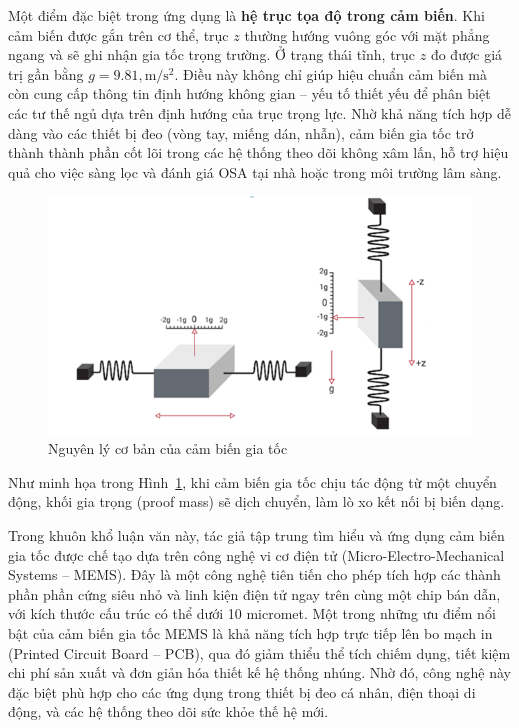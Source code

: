Một điểm đặc biệt trong ứng dụng là \textbf{hệ trục tọa độ trong cảm biến}. Khi
cảm biến được gắn trên cơ thể, trục $z$ thường hướng vuông góc với mặt phẳng
ngang và sẽ ghi nhận gia tốc trọng trường. Ở trạng thái tĩnh, trục $z$ đo được
giá trị gần bằng $g = 9.81, \mathrm{m/s^2}$. Điều này không chỉ giúp hiệu chuẩn
cảm biến mà còn cung cấp thông tin định hướng không gian – yếu tố thiết yếu để
phân biệt các tư thế ngủ dựa trên định hướng của trục trọng lực. Nhờ khả năng
tích hợp dễ dàng vào các thiết bị đeo (vòng tay, miếng dán, nhẫn), cảm biến gia
tốc trở thành thành phần cốt lõi trong các hệ thống theo dõi không xâm lấn, hỗ
trợ hiệu quả cho việc sàng lọc và đánh giá OSA tại nhà hoặc trong môi trường
lâm sàng.
\begin{figure}[!ht]
  \centering
  \includegraphics[width=\textwidth]{images/acce.png}
  \vspace*{-7mm}
  \caption{Nguyên lý cơ bản của cảm biến gia tốc}
  \label{acce}
\end{figure}

Như minh họa trong Hình~\ref{acce}, khi cảm biến gia tốc chịu tác động từ một
chuyển động, khối gia trọng (proof mass) sẽ dịch chuyển, làm lò xo kết nối bị
biến dạng.

Trong khuôn khổ luận văn này, tác giả tập trung tìm hiểu và ứng dụng cảm biến
gia tốc được chế tạo dựa trên công nghệ vi cơ điện tử (Micro-Electro-Mechanical
Systems – MEMS). Đây là một công nghệ tiên tiến cho phép tích hợp các thành
phần phần cứng siêu nhỏ và linh kiện điện tử ngay trên cùng một chip bán dẫn,
với kích thước cấu trúc có thể dưới 10 micromet. Một trong những ưu điểm nổi
bật của cảm biến gia tốc MEMS là khả năng tích hợp trực tiếp lên bo mạch in
(Printed Circuit Board – PCB), qua đó giảm thiểu thể tích chiếm dụng, tiết kiệm
chi phí sản xuất và đơn giản hóa thiết kế hệ thống nhúng. Nhờ đó, công nghệ này
đặc biệt phù hợp cho các ứng dụng trong thiết bị đeo cá nhân, điện thoại di
động, và các hệ thống theo dõi sức khỏe thế hệ mới.

